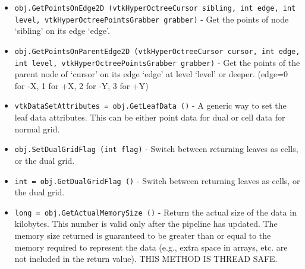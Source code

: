 \begin{itemize}
 
 
 
 
 

\item  \verb|obj.GetPointsOnEdge2D (vtkHyperOctreeCursor sibling, int edge, int level, vtkHyperOctreePointsGrabber grabber)| -  Get the points of node `sibling' on its edge `edge'.
 
 
 
 
 

\item  \verb|obj.GetPointsOnParentEdge2D (vtkHyperOctreeCursor cursor, int edge, int level, vtkHyperOctreePointsGrabber grabber)| -  Get the points of the parent node of `cursor' on its edge `edge' at
 level `level' or deeper. (edge=0 for -X, 1 for +X, 2 for -Y, 3 for +Y)
 
 
 
 

\item  \verb|vtkDataSetAttributes = obj.GetLeafData ()| -  A generic way to set the leaf data attributes.
 This can be either point data for dual or cell data for normal grid.

\item  \verb|obj.SetDualGridFlag (int flag)| -  Switch between returning leaves as cells, or the dual grid.

\item  \verb|int = obj.GetDualGridFlag ()| -  Switch between returning leaves as cells, or the dual grid.

\item  \verb|long = obj.GetActualMemorySize ()| -  Return the actual size of the data in kilobytes. This number
 is valid only after the pipeline has updated. The memory size
 returned is guaranteed to be greater than or equal to the
 memory required to represent the data (e.g., extra space in
 arrays, etc. are not included in the return value). THIS METHOD
 IS THREAD SAFE.

\end{itemize}
